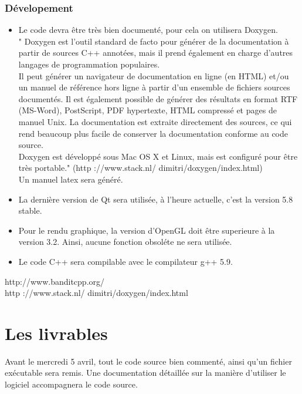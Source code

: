 \documentclass[12pt]{article}
\begin{document}
			\subsubsection{Dévelopement}
				\begin{itemize}
					\item Le code devra être très bien documenté, pour cela on utilisera Doxygen.\\
						" Doxygen est l’outil standard de facto pour générer de la documentation à partir de sources C++ annotées, mais il prend également en charge d’autres langages de programmation	populaires.\\
						Il peut générer un navigateur de documentation en ligne (en HTML) et/ou un manuel de référence hors ligne à partir d’un ensemble de fichiers sources documentés. Il est également possible de générer des résultats en format RTF (MS-Word), PostScript, PDF hypertexte, HTML compressé et pages de manuel Unix. La documentation est extraite directement des sources, ce qui rend beaucoup plus facile de conserver la documentation conforme au code	source.\\
						Doxygen est développé sous Mac OS X et Linux, mais est configuré pour être très portable." (http ://www.stack.nl/ dimitri/doxygen/index.html)\\
						Un manuel latex sera généré.						
					
					\item La dernière version de Qt sera utilisée, à l'heure actuelle, c'est la version 5.8 stable.
					\item Pour le rendu graphique, la version d'OpenGL doit être superieure à la version 3.2. Ainsi, aucune fonction obsoléte ne sera utilisée.
					\item Le code C++ sera compilable avec le compilateur g++ 5.9.
				\end{itemize}

			\vspace*{\fill} 
			http://www.banditcpp.org/\\http ://www.stack.nl/ dimitri/doxygen/index.html
	\newpage

	\section{Les livrables}
		Avant le mercredi 5 avril, tout le code source bien commenté, ainsi qu'un fichier exécutable sera remis. Une documentation détaillée sur la manière d'utiliser le logiciel accompagnera le code source.
	\newpage

	
\end{document}
